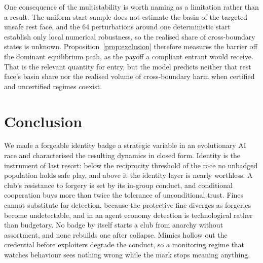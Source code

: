 \documentclass[11pt,a4paper]{article}
\theoremstyle{definition}
\begin{document}
One consequence of the multistability is worth naming as a limitation rather
than a result. The uniform-start sample does not estimate the basin of the
targeted unsafe rest face, and the $64$ perturbations around one deterministic
start establish only local numerical robustness, so the realised share of
cross-boundary states is unknown. Proposition~\ref{prop:exclusion} therefore measures the barrier off
the dominant equilibrium path, as the payoff a compliant entrant would
receive. That is the relevant quantity for entry, but the model predicts
neither that rest face's basin share nor the realised volume of
cross-boundary harm when certified and uncertified regimes coexist.

\section{Conclusion}
\label{sec:conclusion}

We made a forgeable identity badge a strategic variable in an evolutionary AI
race and characterised the resulting dynamics in closed form. Identity is the
instrument of last resort: below the reciprocity threshold of the race no
unbadged population holds safe play, and above it the identity layer is nearly
worthless. A club's resistance to forgery is set by its in-group conduct, and
conditional cooperation buys more than twice the tolerance of unconditional
trust. Fines cannot substitute for detection, because the protective fine
diverges as forgeries become undetectable, and in an agent economy detection is
technological rather than budgetary. No badge by itself starts a club from
anarchy without assortment,
and none rebuilds one after collapse. Mimics hollow out the credential before
exploiters degrade the conduct, so a monitoring regime that watches behaviour
sees nothing wrong while the mark stops meaning anything.
\end{document}
